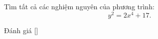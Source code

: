 \ifshowproblem
\begin{problem}\label{problem:THA-2015-TSTST-E-P2}
    Tìm tất cả các nghiệm nguyên của phương trình:
    \[
        y^2 = 2x^4 + 17.
    \]
\end{problem}
\fi

\ifshowinfo
Đánh giá [\textbf{}]\footnotemark
{}
\fi